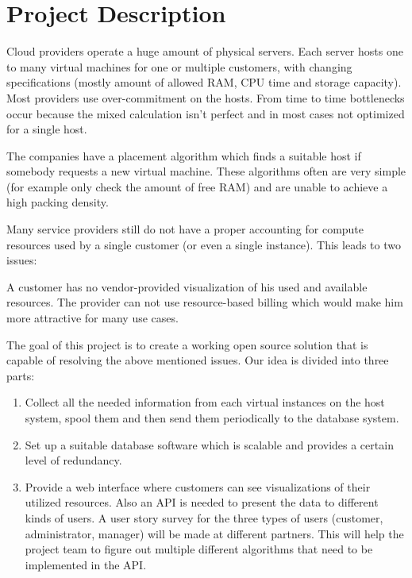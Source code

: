 \section{Project Description}

Cloud providers operate a huge amount of physical servers. Each server hosts
one to many virtual machines for one or multiple customers, with changing
specifications (mostly amount of allowed RAM, CPU time and storage capacity).
Most providers use over-commitment on the hosts. From time to time bottlenecks
occur because the mixed calculation isn’t perfect and in most cases not
optimized for a single host.

The companies have a placement algorithm which finds a suitable host if
somebody requests a new virtual machine. These algorithms often are very
simple (for example only check the amount of free RAM) and are unable to
achieve a high packing density.

Many service providers still do not have a proper accounting for compute
resources used by a single customer (or even a single instance). This leads to
two issues:
\begin{outline}
  \1 A customer has no vendor-provided visualization of his used and
  available resources.
  \1 The provider can not use resource-based billing which would make him more
  attractive for many use cases.
\end{outline}

The goal of this project is to create a working open source solution that is
capable of resolving the above mentioned issues. Our idea is divided into
three parts:
\begin{enumerate}
  \item Collect all the needed information from each virtual instances on the
    host system, spool them and then send them periodically to the database
    system.
  \item Set up a suitable database software which is scalable and provides a
    certain level of redundancy.
  \item Provide a web interface where customers can see visualizations of their
    utilized resources. Also an API is needed to present the data to different
    kinds of users. A user story survey for the three types of users (customer,
    administrator, manager) will be made at different partners. This will help
    the project team to figure out multiple different algorithms that need to
    be implemented in the API.
\end{enumerate}

